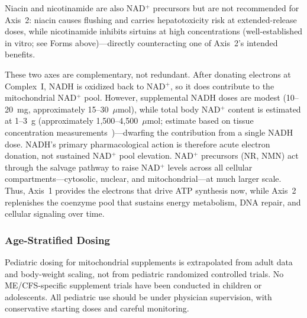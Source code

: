 Niacin and nicotinamide are also NAD$^+$ precursors but are not recommended for Axis~2: niacin causes flushing and carries hepatotoxicity risk at extended-release doses, while nicotinamide inhibits sirtuins at high concentrations (well-established in vitro; see Forms above)---directly counteracting one of Axis~2's intended benefits.

These two axes are complementary, not redundant. After donating electrons at Complex~I, NADH is oxidized back to NAD$^+$, so it does contribute to the mitochondrial NAD$^+$ pool. However, supplemental NADH doses are modest (10--20~mg, approximately 15--30~$\mu$mol), while total body NAD$^+$ content is estimated at 1--3~g (approximately 1,500--4,500~$\mu$mol; estimate based on tissue concentration measurements~\cite{Massudi2012nad})---dwarfing the contribution from a single NADH dose. NADH's primary pharmacological action is therefore acute electron donation, not sustained NAD$^+$ pool elevation. NAD$^+$ precursors (NR, NMN) act through the salvage pathway to raise NAD$^+$ levels across all cellular compartments---cytosolic, nuclear, and mitochondrial---at much larger scale. Thus, Axis~1 provides the electrons that drive ATP synthesis now, while Axis~2 replenishes the coenzyme pool that sustains energy metabolism, DNA repair, and cellular signaling over time.

\subsubsection{Age-Stratified Dosing}

\begin{warning}
Pediatric dosing for mitochondrial supplements is extrapolated from adult data and body-weight scaling, not from pediatric randomized controlled trials. No ME/CFS-specific supplement trials have been conducted in children or adolescents. All pediatric use should be under physician supervision, with conservative starting doses and careful monitoring.
\end{warning}

